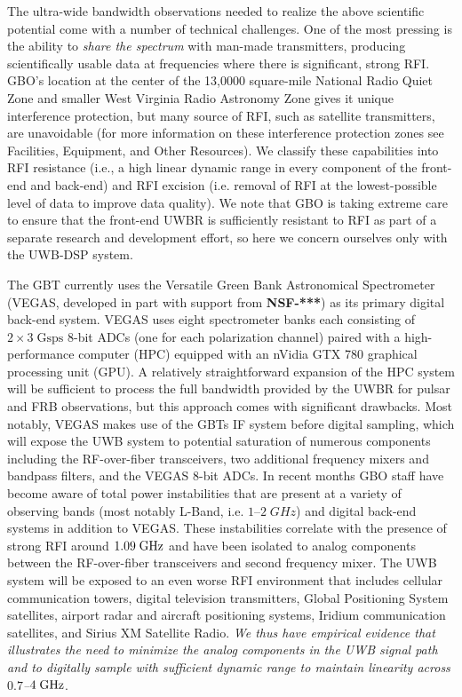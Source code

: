 \documentclass[10pt]{myNSF}
\begin{document}
\label{sec:technical_motivation}

The ultra-wide bandwidth observations needed to realize the above
scientific potential come with a number of technical challenges.  One
of the most pressing is the ability to \emph{share the spectrum} with
man-made transmitters, producing scientifically usable data at
frequencies where there is significant, strong RFI.  GBO's location at
the center of the 13,0000 square-mile National Radio Quiet Zone and
smaller West Virginia Radio Astronomy Zone gives it unique
interference protection, but many source of RFI, such as satellite
transmitters, are unavoidable (for more information on these
interference protection zones see Facilities, Equipment, and Other
Resources).  We classify these capabilities into RFI resistance (i.e.,
a high linear dynamic range in every component of the front-end and
back-end) and RFI excision (i.e. removal of RFI at the lowest-possible
level of data to improve data quality).  We note that GBO is taking
extreme care to ensure that the front-end UWBR is sufficiently
resistant to RFI as part of a separate research and development
effort, so here we concern ourselves only with the UWB-DSP system.

 The GBT currently uses the Versatile
Green Bank Astronomical Spectrometer (VEGAS, developed in part with
support from \textbf{NSF-***}) as its primary digital back-end system.
VEGAS uses eight spectrometer banks each consisting of $2 \times 3\;
\mathrm{Gsps}$ 8-bit ADCs (one for each polarization channel) paired
with a high-performance computer (HPC) equipped with an nVidia GTX 780
graphical processing unit (GPU).  A relatively straightforward
expansion of the HPC system will be sufficient to process the full
bandwidth provided by the UWBR for pulsar and FRB observations, but
this approach comes with significant drawbacks.  Most notably, VEGAS
makes use of the GBTs IF system before digital sampling, which will
expose the UWB system to potential saturation of numerous components
including the RF-over-fiber transceivers, two additional frequency
mixers and bandpass filters, and the VEGAS 8-bit ADCs.  In recent
months GBO staff have become aware of total power instabilities that
are present at a variety of observing bands (most notably L-Band,
i.e. $1$--$2\; GHz$) and digital back-end systems in addition to VEGAS.
These instabilities correlate with the presence of strong RFI around
$1.09\; \textrm{GHz}$ and have been isolated to analog components between the
RF-over-fiber transceivers and second frequency mixer.  The UWB system
will be exposed to an even worse RFI environment that includes
cellular communication towers, digital television transmitters,
Global Positioning System satellites, airport radar and aircraft
positioning systems, Iridium communication satellites, and Sirius XM
Satellite Radio.  \emph{We thus have empirical evidence that
  illustrates the need to minimize the analog components in the UWB
  signal path and to digitally sample with sufficient dynamic range
  to maintain linearity across $0.7$--$4\; \textrm{GHz}$}.
\end{document}
